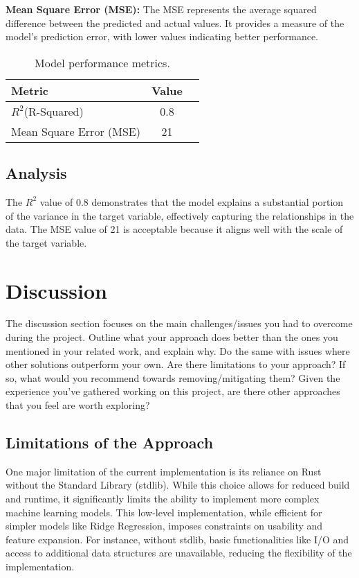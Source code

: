\documentclass{scrartcl}
\begin{document}
\textbf{Mean Square Error (MSE):} 
The MSE represents the average squared difference between the predicted and actual values. It provides a measure of the model's prediction error, with lower values indicating better performance.


\begin{table}[h!]
\centering
\begin{tabular}{|l|c|p{8cm}|}
\hline
\textbf{Metric} & \textbf{Value} \\
\hline
\( R^2 \)(R-Squared) & 0.8  \\
\hline
Mean Square Error (MSE) & 21 \\
\hline
\end{tabular}
\caption{Model performance metrics.}
\label{tab:model-performance}
\end{table}

\subsection*{Analysis}

The \(R^2\) value of 0.8 demonstrates that the model explains a substantial portion of the variance in the target variable, effectively capturing the relationships in the data.
The MSE value of 21 is acceptable because it aligns well with the scale of the target variable.


\section{Discussion}
The discussion section focuses on the main challenges/issues you had to overcome during the project. Outline what your approach does better than the ones you mentioned in your related work, and explain why. Do the same with issues where other solutions  outperform your own. Are there limitations to your approach? If so, what would you recommend towards removing/mitigating them? Given the experience you've gathered working on this project, are there other approaches that you feel are worth exploring?
\subsection{Limitations of the Approach}
One major limitation of the current implementation is its reliance on Rust without the Standard Library (stdlib). While this choice allows for reduced build and runtime, it significantly limits the ability to implement more complex machine learning models. This low-level implementation, while efficient for simpler models like Ridge Regression, imposes constraints on usability and feature expansion. For instance, without stdlib, basic functionalities like I/O and access to additional data structures are unavailable, reducing the flexibility of the implementation.
\end{document}
